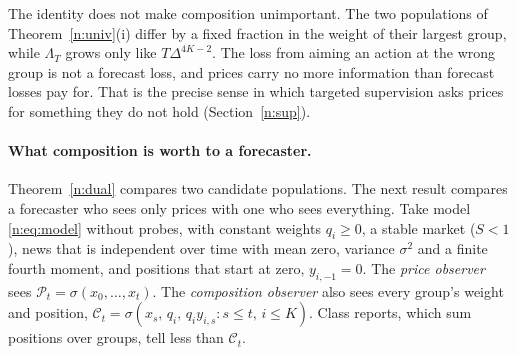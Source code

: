 The identity does not make composition unimportant. The two populations of Theorem~\ref{n:univ}(i) differ by a fixed fraction in the weight of their largest group, while $\Lambda_T$ grows only like $T\Delta^{4K-2}$. The loss from aiming an action at the wrong group is not a forecast loss, and prices carry no more information than forecast losses pay for. That is the precise sense in which targeted supervision asks prices for something they do not hold (Section~\ref{n:sup}).

\paragraph{What composition is worth to a forecaster.} Theorem~\ref{n:dual} compares two candidate populations. The next result compares a forecaster who sees only prices with one who sees everything. Take model \eqref{n:eq:model} without probes, with constant weights $q_i\ge0$, a stable market ($S<1$), news that is independent over time with mean zero, variance $\sigma^2$ and a finite fourth moment, and positions that start at zero, $y_{i,-1}=0$. The \emph{price observer} sees $\mathcal P_t=\sigma(x_0,\ldots,x_t)$. The \emph{composition observer} also sees every group's weight and position, $\mathcal C_t=\sigma(x_s,\,q_i,\,q_iy_{i,s}:s\le t,\,i\le K)$. Class reports, which sum positions over groups, tell less than $\mathcal C_t$.

